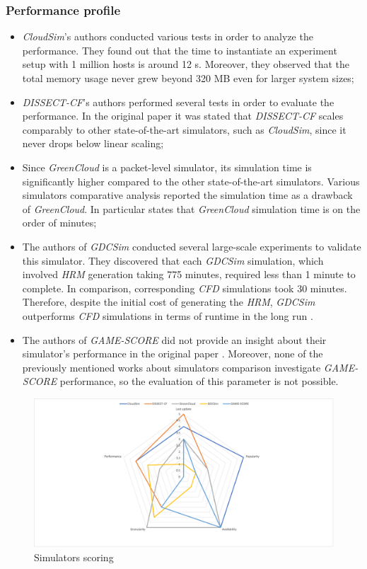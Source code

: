 {\subsubsection{Performance profile}
\begin{itemize}
    \item \emph{CloudSim}'s authors conducted various tests in order to analyze the performance. They found out that the time to instantiate an experiment setup with 1 million hosts is around 12 s. Moreover, they observed that the total memory usage never grew beyond 320 MB even for larger system sizes;
    \item \emph{DISSECT-CF}'s authors performed several tests in order to evaluate the performance. In the original paper it was stated that \emph{DISSECT-CF} scales comparably to other state-of-the-art simulators, such as \emph{CloudSim}, since it never drops below linear scaling;
    \item Since \emph{GreenCloud} is a packet-level simulator, its simulation time is significantly higher compared to the other state-of-the-art simulators. Various simulators comparative analysis reported the simulation time as a drawback of \emph{GreenCloud}. In particular \cite{khalil2017cloud} states that \emph{GreenCloud} simulation time is on the order of minutes;
    \item The authors of \emph{GDCSim} conducted several large-scale experiments to validate this simulator. They discovered that each \emph{GDCSim} simulation, which involved \emph{HRM} generation taking 775 minutes, required less than 1 minute to complete. In comparison, corresponding \emph{CFD} simulations took 30 minutes. Therefore, despite the initial cost of generating the \emph{HRM}, \emph{GDCSim} outperforms \emph{CFD} simulations in terms of runtime in the long run \cite{gupta2014gdcsim}.
    \item The authors of \emph{GAME-SCORE} did not provide an insight about their simulator's performance in the original paper \cite{fernandez2019game}. Moreover, none of the previously mentioned works about simulators comparison investigate \emph{GAME-SCORE} performance, so the evaluation of this parameter is not possible. 
\end{itemize}

\begin{figure}[h]
    \centering
    \includegraphics[width=1\textwidth]{chapters/images/simulators_scoring.png}
    \caption{Simulators scoring}
    \label{fig:radar}
\end{figure}

}

